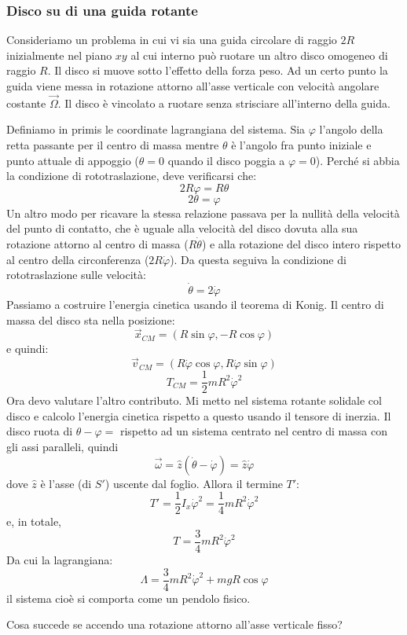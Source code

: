 \documentclass[a4paper,openany]{article}
\begin{document}
	\subsubsection{Disco su di una guida rotante}
	Consideriamo un problema in cui vi sia una guida circolare di raggio $2R$ inizialmente nel piano $xy$ al cui interno può ruotare un altro disco omogeneo di raggio $R$. Il disco si muove sotto l'effetto della forza peso. Ad un certo punto la guida viene messa in rotazione attorno all'asse verticale con velocità angolare costante $\vec{\Omega}$. Il disco è vincolato a ruotare senza strisciare all'interno della guida.
	
	Definiamo in primis le coordinate lagrangiana del sistema. Sia $\varphi$ l'angolo della retta passante per il centro di massa mentre $\theta$ è l'angolo fra punto iniziale e punto attuale di appoggio ($\theta = 0$ quando il disco poggia a $\varphi = 0$). Perché si abbia la condizione di rototraslazione, deve verificarsi che:
	$$
	2R\varphi = R\theta
	$$
	$$
	2\theta = \varphi
	$$
	Un altro modo per ricavare la stessa relazione passava per la nullità della velocità del punto di contatto, che è uguale alla velocità del disco dovuta alla sua rotazione attorno al centro di massa ($R\dot{\theta}$) e alla rotazione del disco intero rispetto al centro della circonferenza ($2R\dot{\varphi}$). Da questa seguiva la condizione di rototraslazione sulle velocità:
	$$
	\dot{\theta} = 2\dot{\varphi}
	$$
	Passiamo a costruire l'energia cinetica usando il teorema di Konig. Il centro di massa del disco sta nella posizione:
	$$
	\vec{x}_{CM}= (R\sin\varphi, -R\cos\varphi)
	$$
	e quindi:
	$$
	\vec{v}_{CM} = (R\dot{\varphi}\cos\varphi, R\dot{\varphi}\sin\varphi)
	$$
	$$
	T_{CM} = \dfrac{1}{2}mR^{2}\dot{\varphi}^{2}
	$$
	Ora devo valutare l'altro contributo. Mi metto nel sistema rotante solidale col disco e calcolo l'energia cinetica rispetto a questo usando il tensore di inerzia. Il disco ruota di $\theta-\varphi = $ rispetto ad un sistema centrato nel centro di massa con gli assi paralleli, quindi 
	$$
	\vec{\omega} = \hat{z}(\dot{\theta}-\dot{\varphi}) = \hat{z}\dot{\varphi}
	$$
	dove $\hat{z}$ è l'asse (di $S'$) uscente dal foglio. Allora il termine $T'$:
	$$
	T' = \dfrac{1}{2}I_x\dot{\varphi}^2 = \dfrac{1}{4}mR^2\dot{\varphi}^2
	$$
	e, in totale,
	$$
	T = \dfrac{3}{4}mR^2\dot{\varphi}^2
	$$
	Da cui la lagrangiana:
	$$
	\Lambda = \dfrac{3}{4}mR^2\dot{\varphi}^2+mgR\cos\varphi
	$$
	il sistema cioè si comporta come un pendolo fisico. 
	
	Cosa succede se accendo una rotazione attorno all'asse verticale fisso? 
\end{document}

